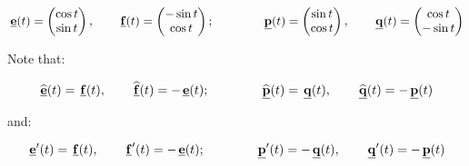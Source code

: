   \[
   \Vector{e}(t)=
  \begin{pmatrix}
   \cos{t}\\\sin{t}
  \end{pmatrix},
  \qquad 
   \Vector{f}(t)=
  \begin{pmatrix}
   -\sin{t}\\\cos{t}
  \end{pmatrix};
  \qquad   \qquad   
  \Vector{p}(t)=
  \begin{pmatrix}
   \sin{t}\\\cos{t}
  \end{pmatrix},
  \qquad
   \Vector{q}(t)=
  \begin{pmatrix}
   \cos{t}\\-\sin{t}
  \end{pmatrix}
  \]

Note that:

\[
 \Vector{ \widehat{e} }(t) =\Vector{f}(t),
 \qquad 
 \Vector{\widehat{f}}(t)=-\Vector{e}(t);
 \qquad \qquad
 \Vector{ \widehat{p} }(t) =\Vector{q}(t),
 \qquad 
 \Vector{\widehat{q}}(t)=-\Vector{p}(t)
\]

and:

\[
 \Vector{e}'(t) =\Vector{f}(t),
 \qquad 
 \Vector{f}'(t)=-\Vector{e}(t);
 \qquad \qquad
 \Vector{p}'(t) =-\Vector{q}(t),
 \qquad
 \Vector{q}'(t)=-\Vector{p}(t)
\]


